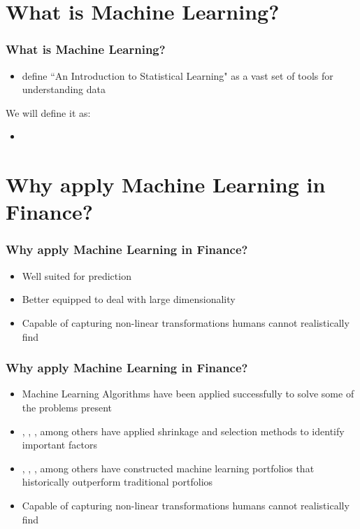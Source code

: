 \documentclass[]{beamer}
\begin{document}
\section{What is Machine Learning?}


\begin{frame}
\frametitle{What is Machine Learning?}
\begin{itemize}
	\item \cite{hastie_elements_2009} define ``An Introduction to Statistical Learning" as a vast set of tools for understanding data
\end{itemize}
We will define it as:
\begin{itemize}
	\item 
\end{itemize}

\end{frame}

\section{Why apply Machine Learning in Finance?}


\begin{frame}
\frametitle{Why apply Machine Learning in Finance?}
\begin{itemize}
	\item Well suited for prediction
	\item Better equipped to deal with large dimensionality
	\item Capable of capturing non-linear transformations humans cannot realistically find
\end{itemize}
\end{frame}

\begin{frame}
\frametitle{Why apply Machine Learning in Finance?}
\begin{itemize}
	\item Machine Learning Algorithms have been applied successfully to solve some of the problems present
	\item \cite{kozak_shrinking_2017}, \cite{rapach_forecasting_2013}, \cite{freyberger_dissecting_2017}, among others have applied shrinkage and selection methods to identify important factors
	\item \cite{gu_empirical_2018}, \cite{hsu_finding_2014}, \cite{feng_deep_2018}, among others have constructed machine learning portfolios that historically outperform traditional portfolios
	\item Capable of capturing non-linear transformations humans cannot realistically find
\end{itemize}
\end{frame}
\end{document}
